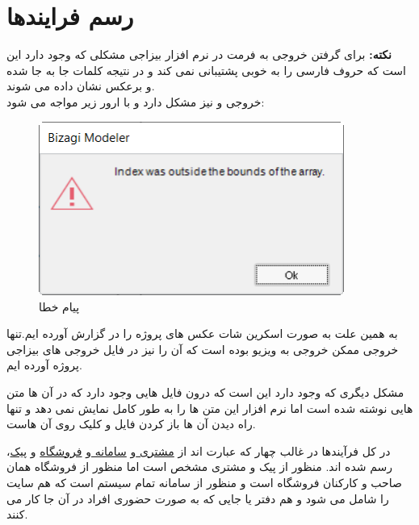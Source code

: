 \documentclass[12pt,a4paper]{article}
\begin{document}
\maketitle
\pagebreak
\tableofcontents
\pagebreak
\listoffigures
\pagebreak
\normalsize	



\pagebreak
\section{رسم فرایندها} \label{section.function}

\textbf{نکته:}
برای گرفتن خروجی به فرمت  در نرم افزار بیزاجی مشکلی که وجود دارد این است که حروف فارسی را به خوبی پشتیبانی نمی کند و در نتیجه کلمات جا به جا شده و برعکس نشان داده می شوند.\\
خروجی  و نیز مشکل دارد و با ارور زیر مواجه می شود:
	\begin{figure}[h!]
		\begin{center}
			\includegraphics[width=10cm]{images/Error.png}	
		\end{center}
		\caption{پیام خطا}
	\end{figure}


به همین علت به صورت اسکرین شات عکس های پروژه را در گزارش آورده ایم.تنها خروجی ممکن خروجی به ویزیو بوده است که آن را نیز در فایل  خروجی های بیزاجی پروژه آورده ایم.


مشکل دیگری که وجود دارد این است که درون فایل  هایی وجود دارد که در آن ها متن هایی نوشته شده است اما نرم افزار این متن ها را به طور کامل نمایش نمی دهد و تنها راه دیدن آن ها باز کردن فایل و کلیک روی آن هاست.


در کل فرآیندها در غالب چهار  که عبارت اند از \underline{مشتری }و \underline{سامانه }و \underline{فروشگاه} و \underline{پیک}، رسم شده اند. منظور از پیک و مشتری مشخص است اما منظور از فروشگاه همان صاحب و کارکنان فروشگاه است و منظور از سامانه تمام سیستم است که هم سایت را شامل می شود و هم دفتر یا جایی که به صورت حضوری افراد در آن جا کار می کنند.
\end{document}
